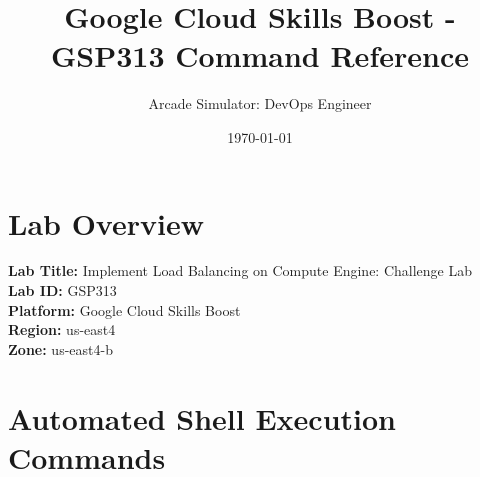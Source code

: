 \documentclass{article}
\title{Google Cloud Skills Boost - GSP313 Command Reference}
\author{Arcade Simulator: DevOps Engineer}
\date{\today}
\begin{document}
\maketitle

\section*{Lab Overview}
\textbf{Lab Title:} Implement Load Balancing on Compute Engine: Challenge Lab \\
\textbf{Lab ID:} GSP313 \\
\textbf{Platform:} Google Cloud Skills Boost \\
\textbf{Region:} us-east4 \\
\textbf{Zone:} us-east4-b

\section*{Automated Shell Execution Commands}
\end{document}
